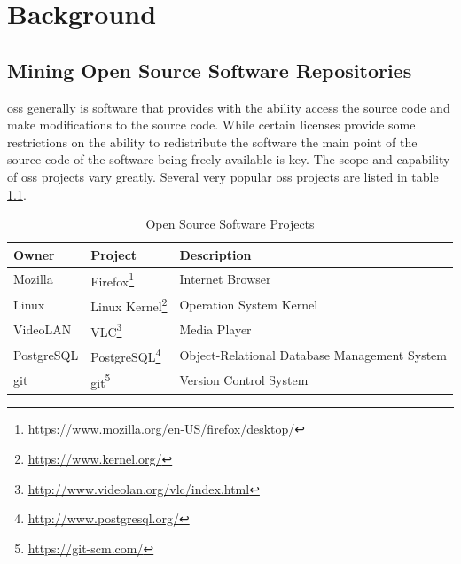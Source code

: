 \chapter{Background}
\label{chap:background}


\section{Mining Open Source Software Repositories}

\gls{oss} generally is software that provides with the ability access the source code and make modifications to the source code. While certain licenses provide some restrictions on the ability to redistribute the software the main point of the source code of the software being freely available is key. The scope and capability of \gls{oss} projects vary greatly. Several very popular \gls{oss} projects are listed in table \ref{tab:oss_projects}.

\begin{table}[h!]
\begin{minipage}{\textwidth} 
\begin{center}
    \begin{tabular}{|l|l|l|}
        \hline
        Owner & Project & Description \\
        \hline

        Mozilla & Firefox\footnote{\url{https://www.mozilla.org/en-US/firefox/desktop/}} & Internet Browser \\
        Linux & Linux Kernel\footnote{\url{https://www.kernel.org/}} & Operation System Kernel \\
        VideoLAN & VLC\footnote{\url{http://www.videolan.org/vlc/index.html}} & Media Player \\
        PostgreSQL & PostgreSQL\footnote{\url{http://www.postgresql.org/}} & Object-Relational Database Management System \\
        git & git\footnote{\url{https://git-scm.com/}} & Version Control System \\
        \hline
    \end{tabular}
\end{center}
\caption{Open Source Software Projects}
\label{tab:oss_projects}
\end{minipage}
\end{table}

